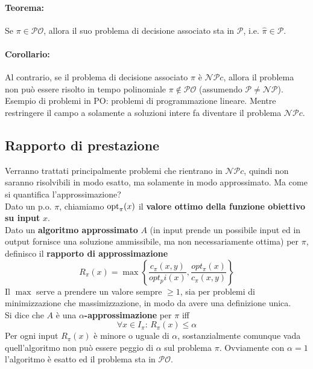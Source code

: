 \paragraph{Teorema:} Se $\pi \in \mathcal{PO}$, allora il suo problema di decisione associato sta in $\mathcal{P}$, i.e. $\hat{\pi} \in \mathcal{P}$.\\

\paragraph{Corollario:} Al contrario, se il problema di decisione associato $\hat{\pi}$ è $\mathcal{NP}c$, allora il problema non può essere risolto in tempo polinomiale $\pi \notin \mathcal{PO}$ (assumendo $\mathcal{P} \neq \mathcal{NP}$).\\

Esempio di problemi in PO: problemi di programmazione lineare. Mentre restringere il campo a solamente a soluzioni intere fa diventare il problema $\mathcal{NP}c$.\\

\newpage

\subsection{Rapporto di prestazione} 

Verranno trattati principalmente problemi che rientrano in $\mathcal{NP}c$, quindi non saranno risolvibili in modo esatto, ma solamente in modo approssimato. Ma come si quantifica l'approssimazione? \\

Dato un p.o. $\pi$, chiamiamo $\operatorname*{opt}_\pi (x)$ il \textbf{valore ottimo della funzione obiettivo su input} $x$.\\
Dato un \textbf{algoritmo approssimato} $A$ (in input prende un possibile input ed in output fornisce una soluzione ammissibile, ma non necessariamente ottima) per $\pi$, definisco il \textbf{rapporto di approssimazione} 
$$ R_\pi (x) = \max \left\{\frac{c_\pi (x,y)}{opt_pi(x)}, \frac{opt_\pi (x)}{c_\pi (x,y)} \right\} $$
Il $\max$ serve a prendere un valore sempre $\geq 1$, sia per problemi di minimizzazione che massimizzazione, in modo da avere una definizione unica.\\

Si dice che $A$ è una \textbf{$\alpha$-approssimazione} per $\pi$ iff 
$$ \forall x \in I_\pi : \, R_\pi (x) \leq \alpha $$
Per ogni input $R_\pi (x)$ è minore o uguale di $\alpha$, sostanzialmente comunque vada quell'algoritmo non può essere peggio di $\alpha$ sul problema $\pi$. Ovviamente con $\alpha = 1$ l'algoritmo è esatto ed il problema sta in $\mathcal{PO}$.\\

